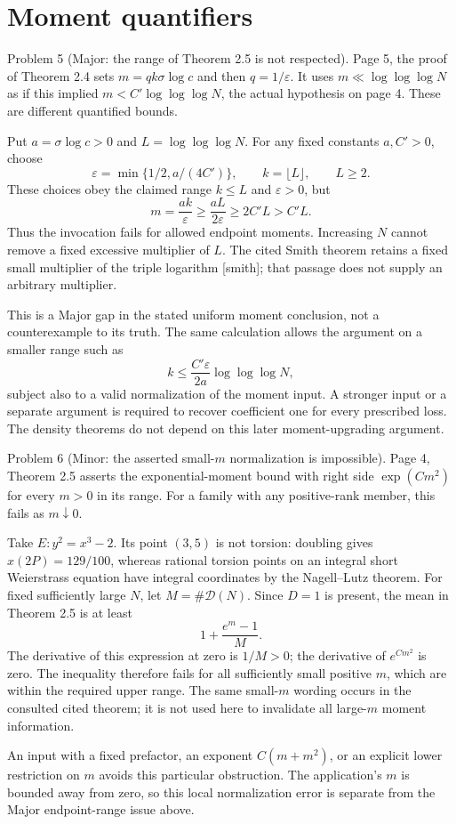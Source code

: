 \documentclass[10pt]{article}
\begin{document}
\section*{Moment quantifiers}
Problem 5 (Major: the range of Theorem 2.5 is not respected).  Page 5, the proof of Theorem 2.4 sets \(m=qk\sigma\log c\) and then \(q=1/\varepsilon\). It uses \(m\ll\log\log\log N\) as if this implied \(m<C'\log\log\log N\), the actual hypothesis on page 4. These are different quantified bounds.\par
Put \(a=\sigma\log c>0\) and \(L=\log\log\log N\). For any fixed constants \(a,C'>0\), choose \[\varepsilon=\min\{1/2,a/(4C')\},\qquad
 k=\lfloor L\rfloor,\qquad L\geq2.\] These choices obey the claimed range \(k\leq L\) and \(\varepsilon>0\), but \[m=\frac{ak}{\varepsilon}
 \geq \frac{aL}{2\varepsilon}\geq2C'L>C'L.\] Thus the invocation fails for allowed endpoint moments. Increasing \(N\) cannot remove a fixed excessive multiplier of \(L\). The cited Smith theorem retains a fixed small multiplier of the triple logarithm [smith]; that passage does not supply an arbitrary multiplier.\par
This is a Major gap in the stated uniform moment conclusion, not a counterexample to its truth. The same calculation allows the argument on a smaller range such as \[k\leq \frac{C'\varepsilon}{2a}\log\log\log N,\] subject also to a valid normalization of the moment input. A stronger input or a separate argument is required to recover coefficient one for every prescribed loss. The density theorems do not depend on this later moment-upgrading argument.\par
Problem 6 (Minor: the asserted small-\(m\) normalization is impossible).  Page 4, Theorem 2.5 asserts the exponential-moment bound with right side \(\exp(Cm^2)\) for every \(m>0\) in its range. For a family with any positive-rank member, this fails as \(m\downarrow0\).\par
Take \(E:y^2=x^3-2\). Its point \((3,5)\) is not torsion: doubling gives \(x(2P)=129/100\), whereas rational torsion points on an integral short Weierstrass equation have integral coordinates by the Nagell–Lutz theorem. For fixed sufficiently large \(N\), let \(M=\#\mathcal D(N)\). Since \(D=1\) is present, the mean in Theorem 2.5 is at least \[1+\frac{e^m-1}{M}.\] The derivative of this expression at zero is \(1/M>0\); the derivative of \(e^{Cm^2}\) is zero. The inequality therefore fails for all sufficiently small positive \(m\), which are within the required upper range. The same small-\(m\) wording occurs in the consulted cited theorem; it is not used here to invalidate all large-\(m\) moment information.\par
An input with a fixed prefactor, an exponent \(C(m+m^2)\), or an explicit lower restriction on \(m\) avoids this particular obstruction. The application’s \(m\) is bounded away from zero, so this local normalization error is separate from the Major endpoint-range issue above.\par
\end{document}
